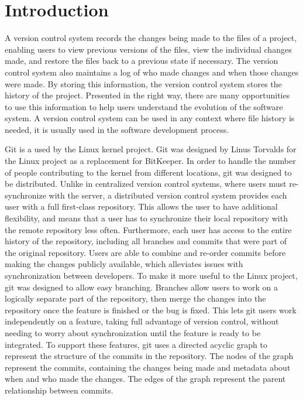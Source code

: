 \chapter{Introduction}

A version control system records the changes being made to the files of
a project,
enabling users to view previous versions of the files,
view the individual changes made,
and restore the files back to a previous state if necessary.
The version control system also maintains a log of who made changes and
when those changes were made.
By storing this information, the version control system stores the
history of the project.
Presented in the right way, there are many opportunities to use
this information to help users understand the evolution of the software
system.
A version control system can be used in any context where file history
is needed, it is usually used in the software development process.

Git is a  used by the Linux kernel
project.
Git was designed by Linus Torvalds for the Linux project as a
replacement for BitKeeper.
In order to handle the number of people
contributing to the kernel from different locations, git was designed to
be distributed.
Unlike in centralized version control systems, where users must
re-synchronize with the server, a distributed version control system
provides each user with a full first-class repository. This allows the
user to have additional flexibility, and means that a user has to
synchronize their local repository with the remote repository less often.
Furthermore, each user has access to the entire history of the
repository, including all branches and commits that were part of the
original repository.
Users are able to combine and re-order commits before making the changes
publicly available, which alleviates issues with synchronization between
developers.
To make it more useful to the Linux project,
git was designed to allow easy branching.
Branches allow users to work on a logically separate part of the
repository, then merge the changes into the repository once the feature
is finished or the bug is fixed.
This lets git users work independently on a feature, taking full
advantage of version control, without needing to worry about
synchronization until the feature is ready to be integrated.
To support these features, git uses a directed acyclic graph to
represent the structure of the commits in the repository.
The nodes of the graph represent the commits, containing the changes
being made and metadata about when and who made the changes.
The edges of the graph represent the parent relationship between
commits.


